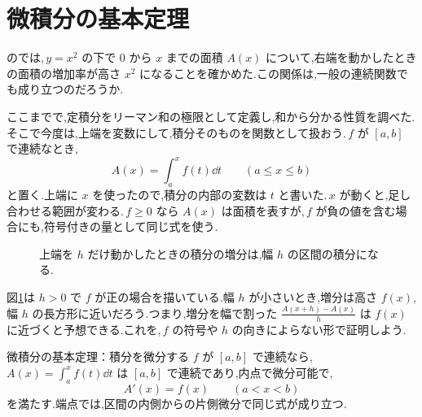 \section{微積分の基本定理}\label{節:基本定理第一}
のでは,\,$y=x^2$ の下で $0$ から $x$ までの面積 $A(x)$ について,右端を動かしたときの面積の増加率が高さ $x^2$ になることを確かめた.この関係は,一般の連続関数でも成り立つのだろうか.

ここまでで,定積分をリーマン和の極限として定義し,和から分かる性質を調べた.そこで今度は,上端を変数にして,積分そのものを関数として扱おう.\,$f$ が $[a,b]$ で連続なとき,
\[
 A(x)=\int_a^x f(t)\dd t\qquad(a\le x\le b)
\]
と置く.上端に $x$ を使ったので,積分の内部の変数は $t$ と書いた.\,$x$ が動くと,足し合わせる範囲が変わる.\,$f\ge0$ なら $A(x)$ は面積を表すが,\,$f$ が負の値を含む場合にも,符号付きの量として同じ式を使う.

\begin{figure}[htbp]
\centering
{}
\caption{上端を $h$ だけ動かしたときの積分の増分は,幅 $h$ の区間の積分になる.}
\label{図:面積関数増分}
\end{figure}

図\ref{図:面積関数増分}は $h>0$ で $f$ が正の場合を描いている.幅 $h$ が小さいとき,増分は高さ $f(x)$,幅 $h$ の長方形に近いだろう.つまり,増分を幅で割った $\frac{A(x+h)-A(x)}h$ は $f(x)$ に近づくと予想できる.これを,\,$f$ の符号や $h$ の向きによらない形で証明しよう.

\begin{theorem}{微積分の基本定理：積分を微分する}\label{定理:基本定理第一}
$f$ が $[a,b]$ で連続なら,\,$A(x)=\int_a^x f(t)\dd t$ は $[a,b]$ で連続であり,内点で微分可能で,
\[
 A'(x)=f(x)\qquad(a<x<b)
\]
を満たす.端点では,区間の内側からの片側微分で同じ式が成り立つ.
\end{theorem}

